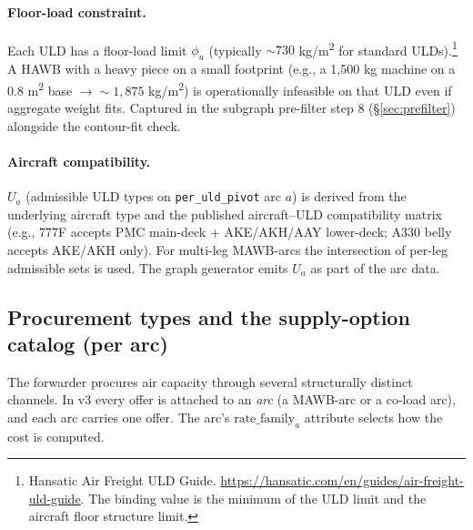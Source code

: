 \documentclass[11pt,a4paper]{article}
\theoremstyle{definition}
\begin{document}
\paragraph{Floor-load constraint.}
Each ULD has a floor-load limit $\phi_u$ (typically $\sim 730$
kg/m\textsuperscript{2} for standard ULDs).\footnote{Hansatic Air Freight ULD
Guide. \url{https://hansatic.com/en/guides/air-freight-uld-guide}. The binding
value is the minimum of the ULD limit and the aircraft floor structure
limit.} A HAWB with a heavy piece on a small footprint (e.g., a 1{,}500 kg
machine on a 0.8 m\textsuperscript{2} base $\to \sim 1{,}875$
kg/m\textsuperscript{2}) is operationally infeasible on that ULD even if
aggregate weight fits. Captured in the subgraph pre-filter step 8
(\S\ref{sec:prefilter}) alongside the contour-fit check.

\paragraph{Aircraft compatibility.}
$U_a$ (admissible ULD types on \texttt{per\_uld\_pivot} arc $a$) is derived
from the underlying aircraft type and the published aircraft--ULD
compatibility matrix (e.g., 777F accepts PMC main-deck + AKE/AKH/AAY
lower-deck; A330 belly accepts AKE/AKH only). For multi-leg MAWB-arcs the
intersection of per-leg admissible sets is used. The graph generator emits
$U_a$ as part of the arc data.

\subsection{Procurement types and the supply-option catalog (per arc)}
\label{sec:supply-option-catalog}

The forwarder procures air capacity through several structurally distinct
channels. In v3 every offer is attached to an \emph{arc} (a MAWB-arc or a
co-load arc), and each arc carries one offer. The arc's
$\text{rate\_family}_a$ attribute selects how the cost is computed.
\end{document}
